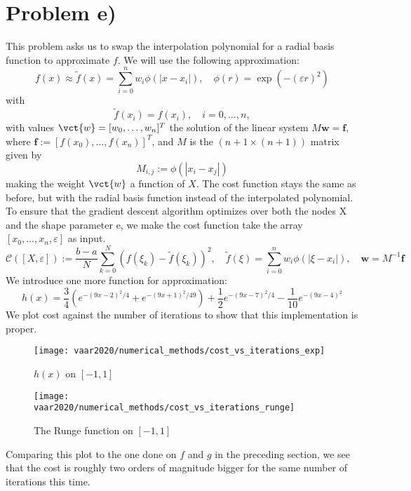 \section{Problem e)}
This problem asks us to swap the interpolation polynomial for a  radial basis function to approximate $f$. We will use the following approximation:
$$ f(x) \approx \tilde{f}(x)=\sum_{i=0}^{n} w_{i} \phi\left(\left|x-x_{i}\right|\right), \quad \phi(r)=\exp \left(-(\varepsilon r)^{2}\right)$$
with
$$\tilde{f}\left(x_{i}\right)=f\left(x_{i}\right), \quad i=0, \ldots, n,$$
with values $\vct{w}=[w_0, \dots, w_n]^T$ the solution of the linear system $M \mathbf{w}=\mathbf{f}$, where $\mathbf{f}:=\left[f\left(x_{0}\right), \ldots, f\left(x_{n}\right)\right]^{T}$, and $M$ is the $(n+1\times(n+1))$ matrix given by
$$M_{i, j}:=\phi\left(\left|x_{i}-x_{j}\right|\right)$$
making the weight $\vct{w}$ a function of $X$.
\newline The cost function stays the same as before, but with the radial basis function instead of the interpolated polynomial. To ensure that the gradient descent algorithm optimizes over both the nodes X and the shape parameter e, we make the cost function take the array $[x_0, \dots, x_n, \varepsilon]$ as input.
$$\mathcal{C}([X, \varepsilon]):=\frac{b-a}{N} \sum_{k=0}^{N}\left(f\left(\xi_{k}\right)-\tilde{f}\left(\xi_{k}\right)\right)^{2}, \quad \tilde{f}(\xi)=
\sum_{i=0}^{n} w_{i} \phi\left(\left|\xi-x_{i}\right|\right), \quad \mathbf{w}=M^{-1} \mathbf{f}$$
We introduce one more function for approximation:
$$ h(x)=\frac{3}{4}\left(e^{-(9 x-2)^{2} / 4}+e^{-(9 x+1)^{2} / 49}\right)+\frac{1}{2} e^{-(9 x-7)^{2} / 4}-\frac{1}{10} e^{-(9 x-4)^{2}}$$
We plot cost against the number of iterations to show that this implementation is proper.
\begin{figure}[H]
    \centering
    \begin{minipage}{0.45\textwidth}
        \centering
        \texttt{[image: vaar2020/numerical\_methods/cost\_vs\_iterations\_exp]} %
        \caption{$h(x)$ on $[-1,1]$}
    \end{minipage}\hfill
    \begin{minipage}{0.45\textwidth}
        \centering
        \texttt{[image: vaar2020/numerical\_methods/cost\_vs\_iterations\_runge]} %
        \caption{The Runge function on $[-1,1]$}
    \end{minipage}
\end{figure}
Comparing this plot to the one done on $f$ and $g$ in the preceding section, we see that the cost is roughly two orders of magnitude bigger for the same number of iterations this time.
